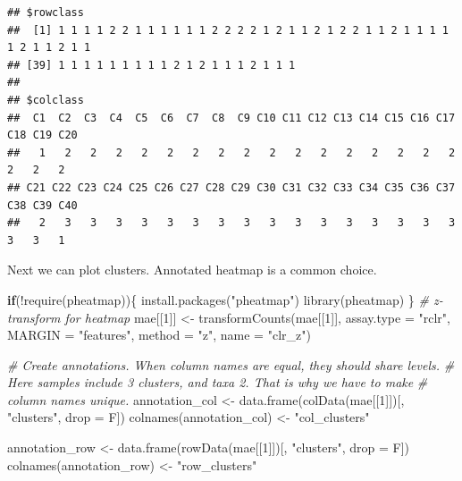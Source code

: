 \documentclass[
]{book}
\newenvironment{Shaded}{\begin{snugshade}}{\end{snugshade}}
\newcommand{\AttributeTok}[1]{\textcolor[rgb]{0.77,0.63,0.00}{#1}}
\newcommand{\CommentTok}[1]{\textcolor[rgb]{0.56,0.35,0.01}{\textit{#1}}}
\newcommand{\ControlFlowTok}[1]{\textcolor[rgb]{0.13,0.29,0.53}{\textbf{#1}}}
\newcommand{\DecValTok}[1]{\textcolor[rgb]{0.00,0.00,0.81}{#1}}
\newcommand{\FunctionTok}[1]{\textcolor[rgb]{0.00,0.00,0.00}{#1}}
\newcommand{\NormalTok}[1]{#1}
\newcommand{\OtherTok}[1]{\textcolor[rgb]{0.56,0.35,0.01}{#1}}
\newcommand{\SpecialCharTok}[1]{\textcolor[rgb]{0.00,0.00,0.00}{#1}}
\newcommand{\StringTok}[1]{\textcolor[rgb]{0.31,0.60,0.02}{#1}}
\begin{document}
\begin{verbatim}
## $rowclass
##  [1] 1 1 1 1 2 2 1 1 1 1 1 1 2 2 2 2 1 2 1 1 2 1 2 2 1 1 2 1 1 1 1 1 2 1 1 2 1 1
## [39] 1 1 1 1 1 1 1 1 1 2 1 2 1 1 1 2 1 1 1
## 
## $colclass
##  C1  C2  C3  C4  C5  C6  C7  C8  C9 C10 C11 C12 C13 C14 C15 C16 C17 C18 C19 C20 
##   1   2   2   2   2   2   2   2   2   2   2   2   2   2   2   2   2   2   2   2 
## C21 C22 C23 C24 C25 C26 C27 C28 C29 C30 C31 C32 C33 C34 C35 C36 C37 C38 C39 C40 
##   2   3   3   3   3   3   3   3   3   3   3   3   3   3   3   3   3   3   3   1
\end{verbatim}

Next we can plot clusters. Annotated heatmap is a common choice.

\begin{Shaded}
\begin{Highlighting}[]
\ControlFlowTok{if}\NormalTok{(}\SpecialCharTok{!}\FunctionTok{require}\NormalTok{(pheatmap))\{}
    \FunctionTok{install.packages}\NormalTok{(}\StringTok{"pheatmap"}\NormalTok{)}
    \FunctionTok{library}\NormalTok{(pheatmap)}
\NormalTok{\}}
\CommentTok{\# z{-}transform for heatmap}
\NormalTok{mae[[}\DecValTok{1}\NormalTok{]] }\OtherTok{\textless{}{-}} \FunctionTok{transformCounts}\NormalTok{(mae[[}\DecValTok{1}\NormalTok{]], }\AttributeTok{assay.type =} \StringTok{"rclr"}\NormalTok{,}
                            \AttributeTok{MARGIN =} \StringTok{"features"}\NormalTok{,}
                            \AttributeTok{method =} \StringTok{"z"}\NormalTok{, }\AttributeTok{name =} \StringTok{"clr\_z"}\NormalTok{)}

\CommentTok{\# Create annotations. When column names are equal, they should share levels. }
\CommentTok{\# Here samples include 3 clusters, and taxa 2. That is why we have to make }
\CommentTok{\# column names unique. }
\NormalTok{annotation\_col }\OtherTok{\textless{}{-}} \FunctionTok{data.frame}\NormalTok{(}\FunctionTok{colData}\NormalTok{(mae[[}\DecValTok{1}\NormalTok{]])[, }\StringTok{"clusters"}\NormalTok{, }\AttributeTok{drop =}\NormalTok{ F])}
\FunctionTok{colnames}\NormalTok{(annotation\_col) }\OtherTok{\textless{}{-}} \StringTok{"col\_clusters"}

\NormalTok{annotation\_row }\OtherTok{\textless{}{-}} \FunctionTok{data.frame}\NormalTok{(}\FunctionTok{rowData}\NormalTok{(mae[[}\DecValTok{1}\NormalTok{]])[, }\StringTok{"clusters"}\NormalTok{, }\AttributeTok{drop =}\NormalTok{ F])}
\FunctionTok{colnames}\NormalTok{(annotation\_row) }\OtherTok{\textless{}{-}} \StringTok{"row\_clusters"}
\end{Highlighting}
\end{Shaded}
\end{document}
